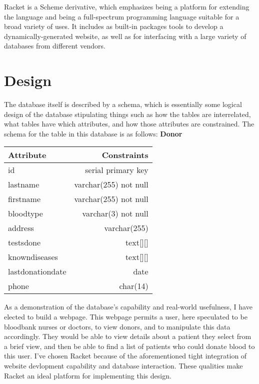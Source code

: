 \documentclass[runningheads,a4paper]{llncs}
\begin{document}
Racket is a Scheme derivative, which emphasizes being a platform for
extending the language and being a full-spectrum programming language
suitable for a broad variety of uses.\cite{racket-org} It includes as
built-in packages tools to develop a dynamically-generated website, as
well as for interfacing with a large variety of databases from
different vendors. 

\section{Design}\label{sec:design}
The database itself is described by a schema, which is essentially
some logical design of the database stipulating things such as how the
tables are interrelated, what tables have which attributes, and how
those attributes are constrained. The schema for the table in this
database is as follows:
\newline
\textbf{Donor}
\newline
\begin{tabular}{| l | r |}
  \hline
  Attribute & Constraints \\
  \hline
  id & serial primary key \\
  lastname & varchar(255) not null \\
  firstname & varchar(255) not null \\
  bloodtype & varchar(3) not null \\
  address & varchar(255) \\
  testsdone & text[][] \\
  knowndiseases & text[][] \\
  lastdonationdate & date \\
  phone & char(14) \\
  \hline
\end{tabular}

As a demonstration of the database's capability and real-world
usefulness, I have elected to build a webpage. This webpage permits a
user, here speculated to be bloodbank nurses or doctors, to view
donors, and to manipulate this data accordingly. They would be able to
view details about a patient they select from a brief view, and then
be able to find a list of patients who could donate blood to this
user.
I've chosen Racket because of the aforementioned tight integration of
website devlopment capability and database interaction. These
qualities make Racket an ideal platform for implementing this design.
\end{document}
